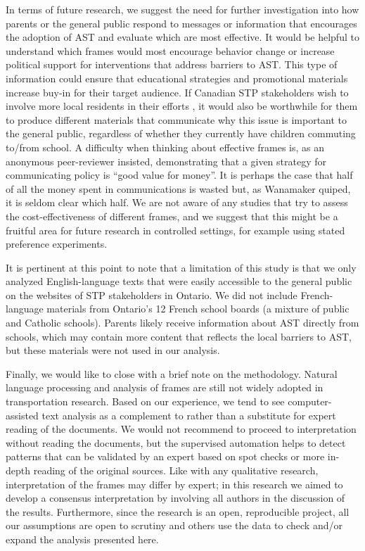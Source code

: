 \documentclass[preprint, 3p,
authoryear]{elsarticle} %
\begin{document}
In terms of future research, we suggest the need for further
investigation into how parents or the general public respond to messages
or information that encourages the adoption of AST and evaluate which
are most effective. It would be helpful to understand which frames would
most encourage behavior change or increase political support for
interventions that address barriers to AST. This type of information
could ensure that educational strategies and promotional materials
increase buy-in for their target audience. If Canadian STP stakeholders
wish to involve more local residents in their efforts
\citep{buttazzoniSupportingActiveSchool2018}, it would also be
worthwhile for them to produce different materials that communicate why
this issue is important to the general public, regardless of whether
they currently have children commuting to/from school. A difficulty when
thinking about effective frames is, as an anonymous peer-reviewer
insisted, demonstrating that a given strategy for communicating policy
is ``good value for money''. It is perhaps the case that half of all the
money spent in communications is wasted but, as Wanamaker quiped, it is
seldom clear which half. We are not aware of any studies that try to
assess the cost-effectiveness of different frames, and we suggest that
this might be a fruitful area for future research in controlled
settings, for example using stated preference experiments.

It is pertinent at this point to note that a limitation of this study is
that we only analyzed English-language texts that were easily accessible
to the general public on the websites of STP stakeholders in Ontario. We
did not include French-language materials from Ontario's 12 French
school boards (a mixture of public and Catholic schools). Parents likely
receive information about AST directly from schools, which may contain
more content that reflects the local barriers to AST, but these
materials were not used in our analysis.

Finally, we would like to close with a brief note on the methodology.
Natural language processing and analysis of frames are still not widely
adopted in transportation research. Based on our experience, we tend to
see computer-assisted text analysis as a complement to rather than a
substitute for expert reading of the documents. We would not recommend
to proceed to interpretation without reading the documents, but the
supervised automation helps to detect patterns that can be validated by
an expert based on spot checks or more in-depth reading of the original
sources. Like with any qualitative research, interpretation of the
frames may differ by expert; in this research we aimed to develop a
consensus interpretation by involving all authors in the discussion of
the results. Furthermore, since the research is an open, reproducible
project, all our assumptions are open to scrutiny and others use the
data to check and/or expand the analysis presented here.

\renewcommand\refname{References}

\end{document}
